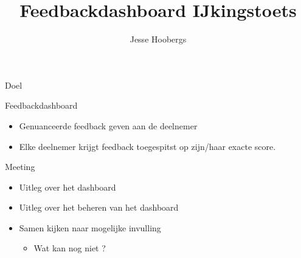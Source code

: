 \documentclass{beamer}
\title{Feedbackdashboard IJkingstoets}
\author{Jesse Hoobergs}
\begin{document}
\begin{frame}[plain]
    \maketitle
\end{frame}

\begin{frame}{Doel}
    \begin{block}{Feedbackdashboard}
        \begin{itemize}
            \item Genuanceerde feedback geven aan de deelnemer
            \item Elke deelnemer krijgt feedback toegespitst op zijn/haar exacte score.
        \end{itemize}
    \end{block}
    
    \begin{block}{Meeting}
            \begin{itemize}
                \item Uitleg over het dashboard
                \item Uitleg over het beheren van het dashboard
                \item Samen kijken naar mogelijke invulling
                \begin{itemize}
                \item Wat kan nog niet ?
                \end{itemize}
            \end{itemize}
        \end{block}
\end{frame}
\end{document}
